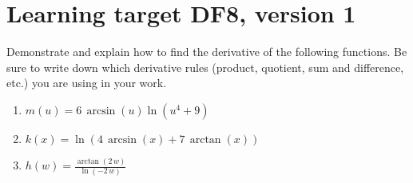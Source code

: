 \section{Learning target DF8, version 1}
\providecommand{\stxKnowl}{}\renewcommand{\stxKnowl}[1]{#1}
\providecommand{\stxOuttro}{}\renewcommand{\stxOuttro}[1]{#1}
\providecommand{\stxTitle}{}\renewcommand{\stxTitle}[1]{#1}
\renewcommand{\stxOuttro}[1]{}
\stxKnowl{
 Demonstrate and explain how to find the derivative of the following functions. Be sure to write down which derivative rules (product, quotient, sum and difference, etc.) you are using in your work. 

\begin{enumerate}
\item
\stxKnowl{
\(\renewcommand{\log}{\ln} m(u)= 6 \, \arcsin\left(u\right) \log\left(u^{4} + 9\right)\)

\stxOuttro{
\(\renewcommand{\log}{\ln} m' (u)= \frac{24 \, u^{3} \arcsin\left(u\right)}{u^{4} + 9} + \frac{6 \, \log\left(u^{4} + 9\right)}{\sqrt{-u^{2} + 1}}\)

}
}
\vfill
\item
\stxKnowl{
\(\renewcommand{\log}{\ln} k(x)= \log\left(4 \, \arcsin\left(x\right) + 7 \, \arctan\left(x\right)\right)\)

\stxOuttro{
\[\renewcommand{\log}{\ln} k' (x)= \frac{\frac{4}{\sqrt{-x^{2} + 1}} + \frac{7}{x^{2} + 1}}{4 \, \arcsin\left(x\right) + 7 \, \arctan\left(x\right)}\]

}
}
\vfill
\item
\stxKnowl{
\(\renewcommand{\log}{\ln} h(w)= \frac{\arctan\left(2 \, w\right)}{\log\left(-2 \, w\right)}\)

\stxOuttro{
\(\renewcommand{\log}{\ln} h' (w)= -\frac{\arctan\left(2 \, w\right)}{w \log\left(-2 \, w\right)^{2}} + \frac{2}{{\left(4 \, w^{2} + 1\right)} \log\left(-2 \, w\right)}\)

}
}
\vfill
\end{enumerate}
}



